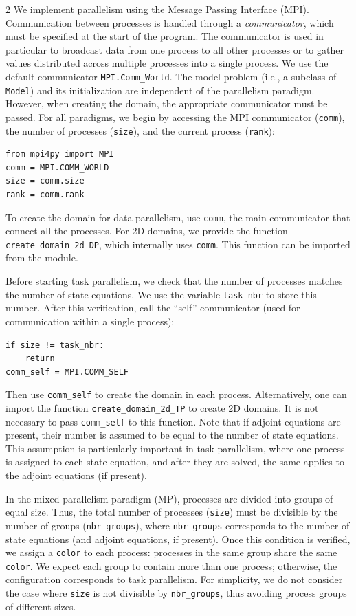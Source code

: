 \documentclass[a4paper, oneside]{article}
\newcommand{\code}[1]{\texttt{#1}}
\begin{document}
\begin{multicols}{2}
We implement parallelism using the Message Passing Interface (MPI). 
Communication between processes is handled through a {\it communicator}, which must be specified at the start of the program. The communicator is used in particular to broadcast data from one process to all other processes or to gather values distributed across multiple processes into a single process.
We use the default communicator \texttt{MPI.Comm\_World}.
The model problem (i.e., a subclass of \code{Model})
and its initialization are independent of the parallelism paradigm.
However, when creating the domain, the appropriate communicator must be passed.
For all paradigms, we begin by accessing the MPI communicator (\code{comm}),
the number of processes (\code{size}), and the current process (\code{rank}):
\begin{lstlisting}
from mpi4py import MPI
comm = MPI.COMM_WORLD
size = comm.size
rank = comm.rank
\end{lstlisting}

To create the domain for data parallelism, use \code{comm},
the main communicator that connect all the processes.
For 2D domains, we provide the function
\code{create\_domain\_2d\_DP}, which internally uses \code{comm}.
This function can be imported from the module.

Before starting task parallelism, we check that the number of processes matches
the number of state equations. We use the variable
\code{task\_nbr} to store this number.
After this verification, call the ``self'' communicator
(used for communication within a single process):
\begin{lstlisting}
if size != task_nbr:
    return
comm_self = MPI.COMM_SELF
\end{lstlisting}
Then use \code{comm\_self} to create the domain in each process.
Alternatively, one can import the function \code{create\_domain\_2d\_TP}
to create 2D domains. It is not necessary to pass \code{comm\_self} to this function.
Note that if adjoint equations are present,
their number is assumed to be equal to the number of state equations.
This assumption is particularly important in task parallelism,
where one process is assigned to each state equation,
and after they are solved,
the same applies to the adjoint equations (if present).

In the mixed parallelism paradigm (MP),
processes are divided into groups of equal size.
Thus, the total number of processes (\code{size}) must be divisible
by the number of groups (\code{nbr\_groups}), where \code{nbr\_groups}
corresponds to the number of state equations (and adjoint equations, if present).
Once this condition is verified, we assign a \code{color} to each process:
processes in the same group share the same \code{color}.
We expect each group to contain more than one process;
otherwise, the configuration corresponds to task parallelism.
For simplicity,
we do not consider the case where \code{size} is not divisible by \code{nbr\_groups},
thus avoiding process groups of different sizes.


\end{multicols}
\end{document}
